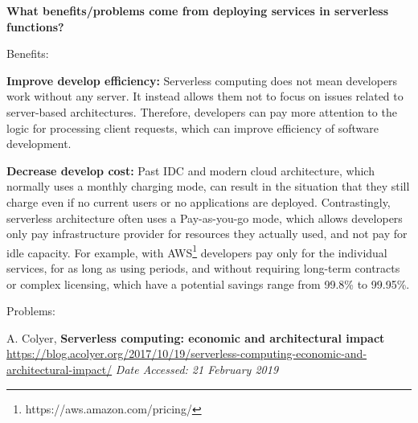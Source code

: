 \documentclass[12pt]{article}
\begin{document}
\pagestyle{empty}

{\bf What benefits/problems come from deploying services in serverless functions?}

Benefits:
\begin{itemize*}
  \item {\bf Improve develop efficiency:} Serverless computing does not mean developers work without any server. It instead allows them not to focus on issues related to server-based architectures. Therefore, developers can pay more attention to the logic for processing client requests, which can improve efficiency of software development. 
  \item {\bf Decrease develop cost:} Past IDC and modern cloud architecture, which normally uses a monthly charging mode, can result in the situation that they still charge even if no current users or no applications are deployed. Contrastingly, serverless architecture often uses a Pay-as-you-go mode, which allows developers only pay infrastructure provider for resources they actually used, and not pay for idle capacity. For example, with AWS\footnote{https://aws.amazon.com/pricing/} developers pay only for the individual services, for as long as using periods, and without requiring long-term contracts or complex licensing, which have a potential savings range from 99.8\% to 99.95\%.
  \item 
  \item 
\end{itemize*}
Problems:
\begin{itemize*}
  \item 
  \item 
  \item 
  \item 
  \item 
\end{itemize*}


{\footnotesize
\begin{thebibliography}{9}
    A. Colyer, \textbf{Serverless computing: economic and architectural impact}
    \url{https://blog.acolyer.org/2017/10/19/serverless-computing-economic-and-architectural-impact/}
    \textit{Date Accessed: 21 February 2019}
    
\end{thebibliography}
}
\end{document}
